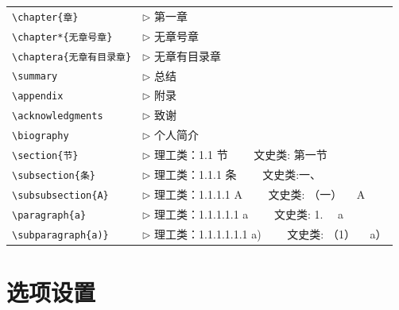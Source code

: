\begin{tabular}{ll}
  \verb|\chapter{章}|              & $\triangleright$ 第一章 \\
  \verb|\chapter*{无章号章}|       & $\triangleright$ 无章号章 \\
  \verb|\chaptera{无章有目录章}|   & $\triangleright$ 无章有目录章 \\
  \verb|\summary|                  & $\triangleright$ 总结\\
  \verb|\appendix|                 & $\triangleright$ 附录\\
  \verb|\acknowledgments|          & $\triangleright$ 致谢\\
  \verb|\biography|                & $\triangleright$ 个人简介\\
  \verb|\section{节}|              & $\triangleright$ 理工类：1.1 节 ~~~~文史类: 第一节 \\
  \verb|\subsection{条}|           & $\triangleright$ 理工类：1.1.1 条 ~~~~文史类:一、\\
  \verb|\subsubsection{A}|         & $\triangleright$ 理工类：1.1.1.1 A  ~~~~文史类: （一） ~~A\\
  \verb|\paragraph{a}|             & $\triangleright$ 理工类：1.1.1.1.1 a  ~~~~文史类: 1. ~~a\\
  \verb|\subparagraph{a)}|         & $\triangleright$ 理工类：1.1.1.1.1.1 a)  ~~~~文史类: （1） ~~a）\\
\end{tabular}

\section{选项设置}

